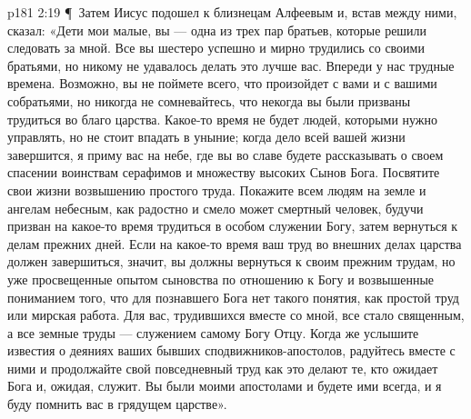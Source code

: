 \vs p181 2:19 \P\ Затем Иисус подошел к близнецам Алфеевым и, встав между ними, сказал: «Дети мои малые, вы --- одна из трех пар братьев, которые решили следовать за мной. Все вы шестеро успешно и мирно трудились со своими братьями, но никому не удавалось делать это лучше вас. Впереди у нас трудные времена. Возможно, вы не поймете всего, что произойдет с вами и с вашими собратьями, но никогда не сомневайтесь, что некогда вы были призваны трудиться во благо царства. Какое\hyp{}то время не будет людей, которыми нужно управлять, но не стоит впадать в уныние; когда дело всей вашей жизни завершится, я приму вас на небе, где вы во славе будете рассказывать о своем спасении воинствам серафимов и множеству высоких Сынов Бога. Посвятите свои жизни возвышению простого труда. Покажите всем людям на земле и ангелам небесным, как радостно и смело может смертный человек, будучи призван на какое\hyp{}то время трудиться в особом служении Богу, затем вернуться к делам прежних дней. Если на какое\hyp{}то время ваш труд во внешних делах царства должен завершиться, значит, вы должны вернуться к своим прежним трудам, но уже просвещенные опытом сыновства по отношению к Богу и возвышенные пониманием того, что для познавшего Бога нет такого понятия, как простой труд или мирская работа. Для вас, трудившихся вместе со мной, все стало священным, а все земные труды --- служением самому Богу Отцу. Когда же услышите известия о деяниях ваших бывших сподвижников\hyp{}апостолов, радуйтесь вместе с ними и продолжайте свой повседневный труд как это делают те, кто ожидает Бога и, ожидая, служит. Вы были моими апостолами и будете ими всегда, и я буду помнить вас в грядущем царстве».
